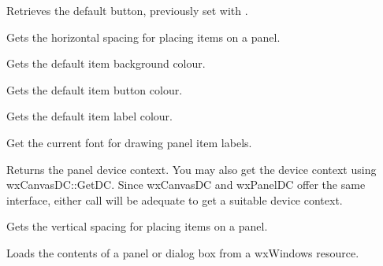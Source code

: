 \label{wxpanelgetdefaultitem}


Retrieves the default button, previously set with .



Gets the horizontal spacing for placing items on a panel.



Gets the default item background colour.



Gets the default item button colour.



Gets the default item label colour.



Get the current font for drawing panel item labels.

\label{wxpanelgetpaneldc}


Returns the panel device context. You may also get the device context
using wxCanvasDC::GetDC. Since wxCanvasDC and wxPanelDC offer the same
interface, either call will be adequate to get a suitable device context.



Gets the vertical spacing for placing items on a panel.

\label{wxpanelloadfromresource}


Loads the contents of a panel or dialog box from a wxWindows resource.

